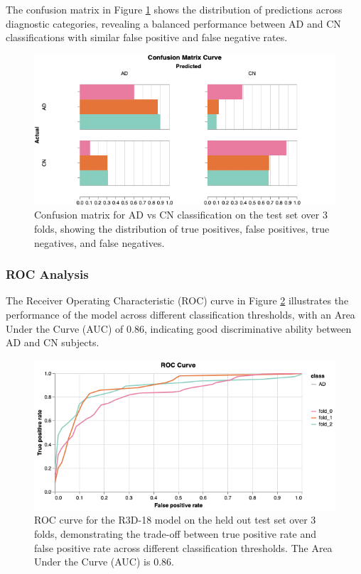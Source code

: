 \documentclass[12pt, a4paper]{article}
\begin{document}
The confusion matrix in Figure \ref{fig:confusion_matrix} shows the distribution of predictions across diagnostic categories, revealing a balanced performance between AD and CN classifications with similar false positive and false negative rates.

\begin{figure}[htbp]
  \centering
  \includegraphics[width=\textwidth]{figures/CM3F.png}
  \caption{Confusion matrix for AD vs CN classification on the test set over 3 folds, showing the distribution of true positives, false positives, true negatives, and false negatives.}
  \label{fig:confusion_matrix}
\end{figure}

\subsubsection{ROC Analysis}

The Receiver Operating Characteristic (ROC) curve in Figure \ref{fig:roc_curve} illustrates the performance of the model across different classification thresholds, with an Area Under the Curve (AUC) of 0.86, indicating good discriminative ability between AD and CN subjects.

\begin{figure}[htbp]
  \centering
  \includegraphics[width=\textwidth]{figures/ROC3F.png}
  \caption{ROC curve for the R3D-18 model on the held out test set over 3 folds, demonstrating the trade-off between true positive rate and false positive rate across different classification thresholds. The Area Under the Curve (AUC) is 0.86.}
  \label{fig:roc_curve}
\end{figure}
\end{document}
